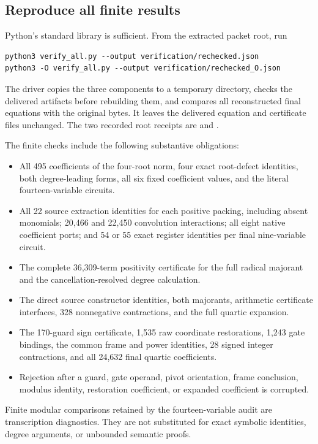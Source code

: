 \documentclass[11pt,a4paper]{article}
\theoremstyle{definition}
\begin{document}
\subsection{Reproduce all finite results}

Python's standard library is sufficient. From the extracted packet root,
run
\begin{Verbatim}[fontsize=\small]
python3 verify_all.py --output verification/rechecked.json
python3 -O verify_all.py --output verification/rechecked_O.json
\end{Verbatim}
The driver copies the three components to a temporary directory, checks
the delivered artifacts before rebuilding them, and compares all
reconstructed final equations with the original bytes. It leaves the
delivered equation and certificate files unchanged. The two recorded root
receipts are  and
.

The finite checks include the following substantive obligations:
\begin{itemize}
 \item All 495 coefficients of the four-root norm, four exact root-defect
 identities, both degree-leading forms, all six fixed coefficient values,
 and the literal fourteen-variable circuits.
 \item All 22 source extraction identities for each positive packing,
 including absent monomials; 20,466 and 22,450 convolution interactions;
 all eight native coefficient ports; and 54 or 55 exact register identities
 per final nine-variable circuit.
 \item The complete 36,309-term positivity certificate for the full
 radical majorant and the cancellation-resolved degree calculation.
 \item The direct source constructor identities, both majorants, arithmetic
 certificate interfaces, 328 nonnegative contractions, and the full
 quartic expansion.
 \item The 170-guard sign certificate, 1,535 raw coordinate restorations,
 1,243 gate bindings, the common frame and power identities, 28 signed
 integer contractions, and all 24,632 final quartic coefficients.
 \item Rejection after a guard, gate operand, pivot orientation, frame
 conclusion, modulus identity, restoration coefficient, or expanded
 coefficient is corrupted.
\end{itemize}
Finite modular comparisons retained by the fourteen-variable audit are
transcription diagnostics. They are not substituted for exact symbolic
identities, degree arguments, or unbounded semantic proofs.
\end{document}

